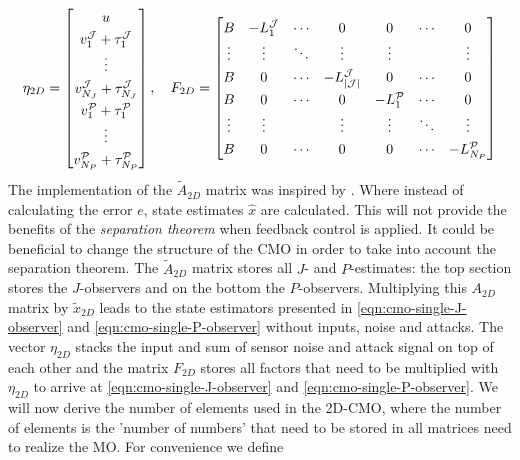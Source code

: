 \begin{equation}\label{eqn:2D-CMO-F-eta}
\renewcommand{\arraystretch}{1.3}
    \eta_{2D} = 
        \begin{bmatrix}
            u \\ v_1^{\mcJ} + \tau_1^{\mcJ} \\ \vdots \\ v_{N_J}^{\mcJ} + \tau_{N_J}^{\mcJ} \\ v_1^{\mcP} + \tau_1^{\mcP} \\ \vdots \\ v_{N_P}^{\mcP} + \tau_{N_P}^{\mcP}\\
        \end{bmatrix}, \quad 
        F_{2D} = 
        \begin{bmatrix}
            B & -L_1^{\mcJ} & \cdots & 0 & 0 & \cdots & 0 \\
            \vdots & \vdots & \ddots & \vdots & \vdots & & \vdots \\
            B & 0 & \cdots & -L_{\cJ}^{\mcJ} & 0 & \cdots & 0 \\
            B & 0 & \cdots & 0 & -L_{1}^{\mcP} & \cdots & 0 \\
            \vdots & \vdots & & \vdots & \vdots & \ddots & \vdots \\
            B & 0 & \cdots & 0 & 0 & \cdots & -L_{N_P}^{\mcP} \\
        \end{bmatrix}
\end{equation}
The implementation of the $\tilde{A}_{2D}$ matrix was inspired by \cite[Equation 16.10]{Hespanha2018LinearTheory}. Where instead of calculating the error $e$, state estimates $\hat{x}$ are calculated. This will not provide the benefits of the \textit{separation theorem} \cite[Theorem 16.12]{Hespanha2018LinearTheory} when feedback control is applied. It could be beneficial to change the structure of the CMO in order to take into account the separation theorem. The $\tilde {A}_{2D}$ matrix stores  all $J$- and $P$-estimates: the top section stores the $J$-observers and on the bottom the $P$-observers. Multiplying this ${A}_{2D}$ matrix by $\tilde{x}_{2D}$ leads to the state estimators presented in \eqref{eqn:cmo-single-J-observer} and \eqref{eqn:cmo-single-P-observer} without inputs, noise and attacks. The vector $\eta_{2D}$ stacks the input and sum of sensor noise and attack signal on top of each other and the matrix $F_{2D}$ stores all factors that need to be multiplied with $\eta_{2D}$ to arrive at \eqref{eqn:cmo-single-J-observer} and \eqref{eqn:cmo-single-P-observer}. We will now derive the number of elements used in the 2D-CMO, where the number of elements is the 'number of numbers' that need to be stored in all matrices need to realize the MO. For convenience we define
